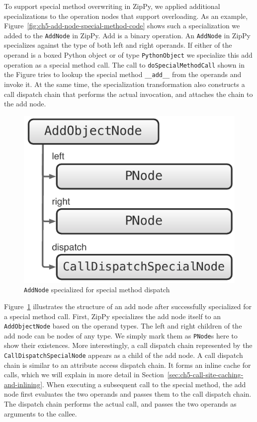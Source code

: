 To support special method overwriting in ZipPy, we applied additional specializations to the operation nodes that support overloading.
As an example, Figure~\ref{fig:ch5-add-node-special-method-code} shows such a specialization we added to the \texttt{AddNode} in ZipPy.
Add is a binary operation.
An \texttt{AddNode} in ZipPy specializes against the type of both left and right operands.
If either of the operand is a boxed Python object or of type \texttt{PythonObject} we specialize this add operation as a special method call.
The call to \texttt{doSpecialMethodCall} shown in the Figure tries to lookup the special method \texttt{\_\_add\_\_} from the operands and invoke it.
At the same time, the specialization transformation also constructs a call dispatch chain that performs the actual invocation, and attaches the chain to the add node.

\begin{figure}
\centering
\includegraphics[scale=.5]{figures/ch5-add-node-with-special-dispatch}
\caption{\texttt{AddNode} specialized for special method dispatch}
\label{fig:ch5-add-node-with-special-dispatch}
\end{figure}

Figure~\ref{fig:ch5-add-node-with-special-dispatch} illustrates the structure of an add node after successfully specialized for a special method call.
First, ZipPy specializes the add node itself to an \texttt{AddObjectNode} based on the operand types.
The left and right children of the add node can be nodes of any type.
We simply mark them as \texttt{PNode}s here to show their existences.
More interestingly, a call dispatch chain represented by the \texttt{CallDispatchSpecialNode} appears as a child of the add node.
A call dispatch chain is similar to an attribute access dispatch chain.
It forms an inline cache for calls, which we will explain in more detail in Section~\ref{sec:ch5-call-site-caching-and-inlining}.
When executing a subsequent call to the special method, the add node first evaluates the two operands and passes them to the call dispatch chain.
The dispatch chain performs the actual call, and passes the two operands as arguments to the callee.

